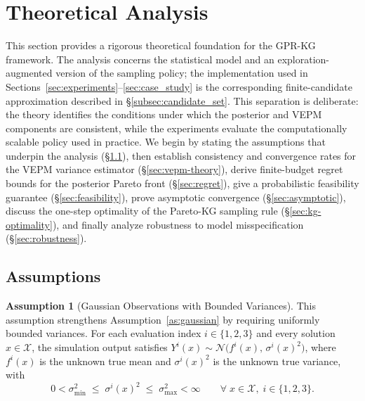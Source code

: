 \documentclass[12pt]{article}
\theoremstyle{plain}
\theoremstyle{definition}
\newtheorem{assumption}{Assumption}[section]
\theoremstyle{remark}
\begin{document}
\section{Theoretical Analysis}\label{sec:theory}

This section provides a rigorous theoretical foundation for the GPR-KG
framework.  The analysis concerns the statistical model and an
exploration-augmented version of the sampling policy; the implementation
used in Sections~\ref{sec:experiments}--\ref{sec:case_study} is the
corresponding finite-candidate approximation described in
\S\ref{subsec:candidate_set}.  This separation is deliberate: the theory
identifies the conditions under which the posterior and VEPM components
are consistent, while the experiments evaluate the computationally
scalable policy used in practice.  We begin by stating the assumptions
that underpin the analysis (\S\ref{sec:assumptions}), then establish
consistency and convergence rates for the VEPM variance estimator
(\S\ref{sec:vepm-theory}), derive
finite-budget regret bounds for the posterior Pareto front
(\S\ref{sec:regret}), give a probabilistic feasibility guarantee
(\S\ref{sec:feasibility}), prove asymptotic convergence
(\S\ref{sec:asymptotic}), discuss the one-step optimality of the Pareto-KG
sampling rule (\S\ref{sec:kg-optimality}), and finally analyze robustness
to model misspecification (\S\ref{sec:robustness}).

\subsection{Assumptions}\label{sec:assumptions}

\begin{assumption}[Gaussian Observations with Bounded Variances]\label{asm:gaussian}
This assumption strengthens Assumption~\ref{as:gaussian} by requiring
uniformly bounded variances.
For each evaluation index $i\in\{1,2,3\}$ and every solution
$x\in\mathcal{X}$, the simulation output satisfies
$Y^{i}(x)\sim\mathcal{N}\!\bigl(f^{i}(x),\,\sigma^{i}(x)^{2}\bigr)$,
where $f^{i}(x)$ is the unknown true mean and $\sigma^{i}(x)^{2}$ is the
unknown true variance, with
\[
  0 < \sigma_{\min}^{2} \;\le\; \sigma^{i}(x)^{2} \;\le\;
  \sigma_{\max}^{2} < \infty
  \qquad\forall\; x\in\mathcal{X},\; i\in\{1,2,3\}.
\]
\end{assumption}
\end{document}
